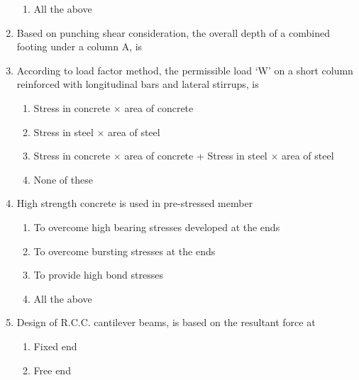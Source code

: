 \documentclass[11pt,a4paper]{article}
\begin{document}
\begin{enumerate}
\begin{enumerate}[label=\Alph*.]
\item{All the above}
\end{enumerate}
\item{Based on punching shear consideration, the overall depth of a combined footing under a column A, is}
\\
\item{According to load factor method, the permissible load `W' on a short column reinforced with longitudinal bars and lateral stirrups, is
}
\begin{enumerate}[label=\Alph*.]
\item{Stress in concrete $\times$ area of concrete}
\item{Stress in steel $\times$ area of steel}
\item{Stress in concrete $\times$ area of concrete + Stress in steel $\times$ area of steel}
\item{None of these}
\end{enumerate}
\item{High strength concrete is used in pre-stressed member}
\begin{enumerate}[label=\Alph*.]
\item{To overcome high bearing stresses developed at the ends}
\item{To overcome bursting stresses at the ends}
\item{To provide high bond stresses}
\item{All the above}
\end{enumerate}
\item{Design of R.C.C. cantilever beams, is based on the resultant force at}
\begin{enumerate}[label=\Alph*.]
\item{Fixed end}
\item{Free end}

\end{enumerate}
\end{enumerate}
\end{document}
